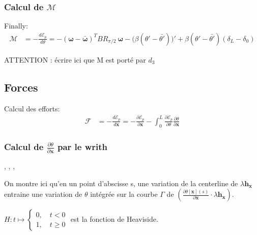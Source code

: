 \subsubsection{Calcul de $\mathcal{M}$}

Finally:
\begin{align}
\mathcal{M} 	& = -\frac{d\mathcal{E}_p}{d\theta} = -(\boldsymbol{\omega} - \bar{\boldsymbol{\omega}})^T B R_{\pi/2}\:\boldsymbol{\omega} - \big(\beta(\theta'-{\bar{\theta'}})\big)' + \beta(\theta'-{\bar{\theta'}})(\delta_L-\delta_0)
\end{align}

ATTENTION : écrire ici que M est porté par $d_3$

\subsection{Forces}

Calcul des efforts:
\begin{align}
\boldsymbol{\mathcal{F}} & = -\frac{d\mathcal{E}_p}{d\boldsymbol{x}} =  - \frac{\partial \mathcal{E}_p}{\partial \boldsymbol{x}} - \int_{0}^{L} \tfrac{\partial \mathcal{E}_p}{\partial \theta} \tfrac{\partial \theta}{\partial \boldsymbol{x}}
\end{align}


\subsubsection{Calcul de $\frac{\partial \theta}{\partial \boldsymbol{x}}$ par le writh}

\cite{Fuller1978}, \cite{deVries2005},  \cite{Vauquelin2000}, \cite{Berger2009}

On montre ici qu'en un point d'abscisse s, une variation de la centerline de $\lambda \boldsymbol{h_x}$ entraine une variation de $\theta$ intégrée sur la courbe $\Gamma$ de $(\frac{\partial \theta[\boldsymbol{x}](s)}{\partial\boldsymbol{x}} \cdot \lambda \boldsymbol{h_x})$.

$H : t \mapsto \left\{\begin{array}{c}0  , \quad t<0 \\1  , \quad t\geqslant0\end{array}\right.$ est la fonction de Heaviside.

